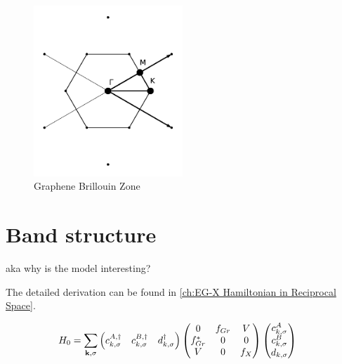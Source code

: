 \documentclass[../main.tex]{subfiles}
\begin{document}
\begin{figure}[t]
	\centering
	\includegraphics[width=0.5\textwidth]{images/graphene brillouin_zone}
	\caption{Graphene Brillouin Zone}
	\label{fig:graphene Brillouin zone}
\end{figure}

\section{Band structure}

aka why is the model interesting?

The detailed derivation can be found in \cref{ch:EG-X Hamiltonian in Reciprocal Space}.

\begin{align}
	H_0 &= \sum_{\bm{\mathrm{k}}, \sigma} \begin{pmatrix} c_{k, \sigma}^{A, \dagger} & c_{k, \sigma}^{B, \dagger} & d_{k, \sigma}^{\dagger} \end{pmatrix}
	\begin{pmatrix}
		0 & f_{Gr} & V \\
		f_{Gr}^* & 0 & 0 \\
		V & 0 & f_{X}
	\end{pmatrix} \begin{pmatrix} c_{k, \sigma}^{A} \\ c_{k, \sigma}^{B} \\ d_{k, \sigma} \end{pmatrix}
	\label{eq:EG-X Hamiltonian non-interacting matrix}
\end{align}
	
	
\end{document}
